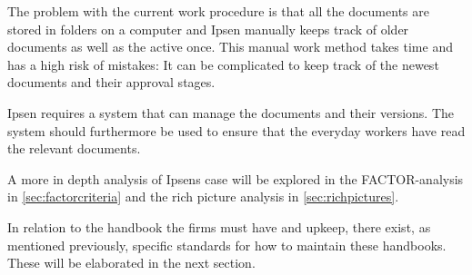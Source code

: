 The problem with the current work procedure is that all the documents are stored in folders on a computer and Ipsen manually keeps track of older documents as well as the active once.
This manual work method takes time and has a high risk of mistakes:
It can be complicated to keep track of the newest documents and their approval stages.

Ipsen requires a system that can manage the documents and their versions.
The system should furthermore be used to ensure that the everyday workers have read the relevant documents.

A more in depth analysis of Ipsens case will be explored in the FACTOR-analysis in \cref{sec:factorcriteria} and the rich picture analysis in \cref{sec:richpictures}.

In relation to the handbook the firms must have and upkeep, there exist, as mentioned previously, specific standards for how to maintain these handbooks.
These will be elaborated in the next section.
